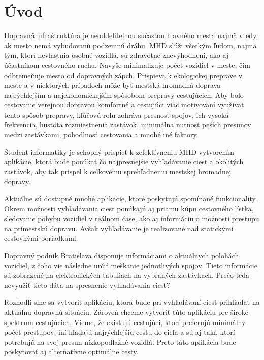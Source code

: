 \chapter*{Úvod} %

Dopravná infraštruktúra je neoddeliteľnou súčasťou hlavného mesta najmä vtedy, ak mesto nemá vybudovanú podzemnú dráhu. MHD slúži všetkým ľudom, najmä tým, ktorí nevlastnia osobné vozidlá, sú zdravotne znevýhodnení, ako aj účastníkom cestovného ruchu. Navyše minimalizuje počet vozidiel v meste, čím odbremeňuje mesto od dopravných zápch. Prispieva k ekologickej preprave v meste a v niektorých prípadoch môže byť mestská hromadná doprava najrýchlejším a najekonomickejším spôsobom prepravy cestujúcich.
Aby bolo cestovanie verejnou dopravou komfortné a cestujúci viac motivovaní využívať tento spôsob prepravy, kľúčovú rolu zohráva presnosť spojov, ich vysoká frekvencia, hustota rozmiestnenia zastávok, minimálna nutnosť peších presunov medzi zastávkami, pohodlnosť cestovania a mnohé iné faktory. 

Študent informatiky je schopný prispieť k zefektívneniu MHD vytvorením aplikácie, ktorá bude ponúkať čo najpresnejšie vyhľadávanie ciest a okolitých zastávok, aby tak prispel k celkovému sprehľadneniu mestskej hromadnej dopravy.

Aktuálne sú dostupné mnohé aplikácie, ktoré poskytujú spomínané funkcionality. Okrem možnosti vyhľadávania ciest ponúkajú aj priamu kúpu cestovného lístka, sledovanie pohybu vozidiel v reálnom čase, ako aj informáciu o možnosti prestupu na prímestskú dopravu. Avšak vyhľadávanie je realizované nad statickými cestovnými poriadkami. 

Dopravný podnik Bratislava disponuje informáciami o aktuálnych polohách vozidiel, z čoho vie následne určiť meškanie jednotlivých spojov. Tieto informácie sú zobrazené na elektronických tabuliach na vybraných zastávkach. Prečo teda nevyužiť tieto dáta na spresnenie vyhľadávania ciest? 

Rozhodli sme sa vytvoriť aplikáciu, ktorá bude pri vyhľadávaní ciest prihliadať na aktuálnu dopravnú situáciu. Zároveň chceme vytvoriť túto aplikáciu pre široké spektrum cestujúcich. Vieme, že existujú cestujúci, ktorí preferujú minimálny počet prestupov, iní hľadajú najrýchlejšiu cestu do cieľa a sú aj takí, ktorí potrebujú na svoj presun nízkopodlažné vozidlá. Preto táto aplikácia bude poskytovať aj alternatívne optimálne cesty.

